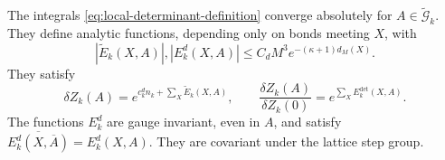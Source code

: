 \begin{proposition}\label{prop:local-determinant-expansion}
The integrals \eqref{eq:local-determinant-definition} converge
absolutely for $A\in\widetilde{\mathcal G}_k$. They define analytic
functions, depending only on bonds meeting $X$, with
\begin{equation}\label{eq:local-determinant-bound}
 |\widetilde E_k(X,A)|, |E_k^d(X,A)|
               \le C_dM^3e^{-(\kappa+1)d_M(X)}.
\end{equation}
They satisfy
\begin{equation}\label{eq:local-determinant-quotient}
 \delta Z_k(A)=e^{c_k^dn_k+\sum_X\widetilde E_k(X,A)},\qquad
 \frac{\delta Z_k(A)}{\delta Z_k(0)}
                         =e^{\sum_XE_k^{\mathrm{det}}(X,A)}.
\end{equation}
The functions $E_k^d$ are gauge invariant, even in $A$, and satisfy
$\overline{E_k^d(X,\overline A)}=E_k^d(X,A)$. They are covariant
under the lattice step group.
\end{proposition}

